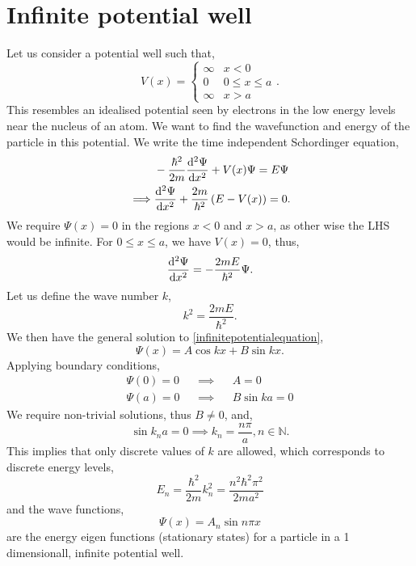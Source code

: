 \documentclass{book}
\begin{document}
\section{Infinite potential well}
Let us consider a potential well such that,
\begin{equation}
	V(x) = \begin{cases}
		\infty & x < 0 \\
		0 & 0 \leq x \leq a \\
		\infty & x > a
	\end{cases}.
\end{equation}
This resembles an idealised potential seen by electrons in the low energy levels near the nucleus of an atom. We want to find the wavefunction and energy of the particle in this potential. We write the time independent Schordinger equation,
\begin{equation}
	\begin{split}
	& -\frac{\hbar^2}{2m}\dv[2]{\Psi}{x} + V(x)\Psi = E\Psi\\
	\implies & \dv[2]{\Psi}{x} + \frac{2m}{\hbar^2} \left(E-V(x)\right) = 0.
	\end{split}
\end{equation}
We require $\Psi(x) = 0$ in the regions $x < 0$ and $x > a$, as other wise the LHS would be infinite. For $0 \leq x \leq a$, we have $V(x) =0$, thus,
\begin{equation}
	\dv[2]{\Psi}{x} = - \frac{2mE}{\hbar^2}\Psi \label{infinitepotentialequation}.
\end{equation}
Let us define the wave number $k$, 
\begin{equation}
	k^2 = \frac{2mE}{\hbar^2}.
\end{equation}
We then have the general solution to \eqref{infinitepotentialequation},
\begin{equation}
	\Psi(x) = A\cos kx + B \sin kx.
\end{equation}
Applying boundary conditions,
\begin{align}
	\Psi(0) = 0 && \implies && A = 0 \\
	\Psi(a) = 0 && \implies && B\sin ka = 0
\end{align}
We require non-trivial solutions, thus $B \neq 0$, and,
\begin{equation}
	\sin k_n a = 0 \implies k_n = \frac{n\pi}{a}, n \in \mathbb{N}.
\end{equation}
This implies that only discrete values of $k$ are allowed, which corresponds to discrete energy levels,
\begin{equation}
	E_n = \frac{\hbar^2}{2m}k_n^2 = \frac{n^2\hbar^2\pi^2}{2ma^2}
\end{equation}
and the wave functions,
\begin{equation}
	\Psi(x) = A_n \sin n\pi x
\end{equation}
are the energy eigen functions (stationary states) for a particle in a 1 dimensionall, infinite potential well.
\end{document}

